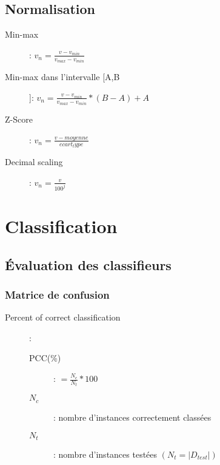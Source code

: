\section{Normalisation}

\begin{description}
\item[Min-max]: $v_n = \frac{v-v_{min}}{v_{max} - v_{min}}$
\item[Min-max dans l'intervalle [A,B]]: $v_n = \frac{v-v_{min}}{v_{max} - v_{min}} * (B-A) + A$
\item[Z-Score]: $v_n = \frac{v - moyenne}{ecart_type}$
\item[Decimal scaling]: $v_n = \frac{v}{100^j}$
\end{description}

\pagebreak
\chapter{Classification}
\section{Évaluation des classifieurs}
\subsection{Matrice de confusion}
\begin{description}
\item[Percent of correct classification]:
\begin{description}
\item[PCC(\%)]: $ = \frac{N_c}{N_t} * 100$
\item[$N_c$]: nombre d'instances correctement classées
\item[$N_t$]: nombre d'instances testées $(N_t = |D_{test}|)$
\end{description} 
\end{description}

